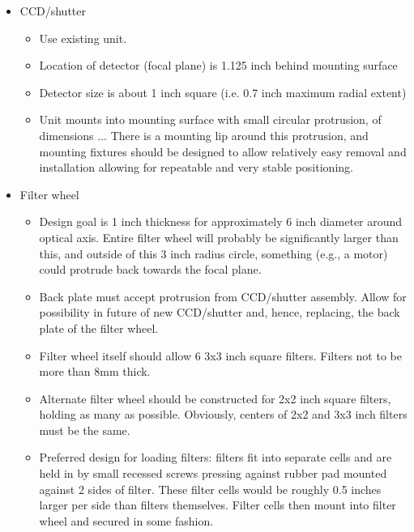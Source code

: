 \documentclass{report}[12pt]
\begin{document}
\begin{itemize}
\item CCD/shutter

\begin{itemize}
\item Use existing unit.

\item Location of detector (focal plane) is 1.125 inch behind mounting surface

\item Detector size is about 1 inch square (i.e. 0.7 inch maximum radial extent)

\item Unit mounts into mounting surface with small circular protrusion, of
dimensions ... There is a mounting lip around this protrusion, and mounting
fixtures should be designed to allow relatively easy removal and installation
allowing for repeatable and very stable positioning.

\end{itemize}

\item Filter wheel
\begin{itemize}

\item Design goal is 1 inch thickness for approximately 6 inch diameter 
around optical axis. Entire filter wheel will probably be significantly
larger than this, and outside of this 3 inch radius circle, something 
(e.g., a motor) could protrude back towards the focal plane.

\item Back plate must accept protrusion from CCD/shutter assembly. Allow
for possibility in future of new CCD/shutter and, hence, replacing, the
back plate of the filter wheel.

\item Filter wheel itself should allow 6 3x3 inch square filters. Filters
not to be more than 8mm thick. 

\item Alternate filter wheel should be constructed for 2x2 inch square filters,
holding as many as possible. Obviously, centers of 2x2 and 3x3 inch filters
must be the same.

\item Preferred design for loading filters: filters fit into separate cells
and are held in by small recessed screws pressing against rubber pad mounted
against 2 sides of filter. These filter cells would be roughly 0.5 inches
larger per side than filters themselves. Filter cells then mount into
filter wheel and secured in some fashion.


\end{itemize}
\end{itemize}
\end{document}
